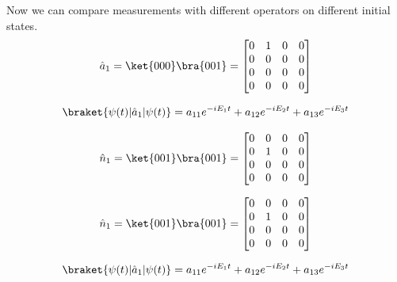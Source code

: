 {Now we can compare measurements with different operators on different initial states.
\begin{equation}
    \hat{a}_1 = \ket{000}\bra{001} =
    \begin{bmatrix}
        0 & 1 & 0 & 0 \\
        0 & 0 & 0 & 0 \\
        0 & 0 & 0 & 0 \\
        0 & 0 & 0 & 0 \\
    \end{bmatrix}
\end{equation}

\begin{equation}
    \braket{\psi(t)|\hat{a}_1|\psi(t)} = a_{11} e^{-i E_1 t} + a_{12} e^{-i E_2 t} + a_{13} e^{-i E_3 t}
\end{equation}

\begin{equation}
    \hat{n}_1 = \ket{001}\bra{001} =
    \begin{bmatrix}
        0 & 0 & 0 & 0 \\
        0 & 1 & 0 & 0 \\
        0 & 0 & 0 & 0 \\
        0 & 0 & 0 & 0 \\
    \end{bmatrix}
\end{equation}


\begin{equation}
    \hat{n}_1 = \ket{001}\bra{001} =
    \begin{bmatrix}
        0 & 0 & 0 & 0 \\
        0 & 1 & 0 & 0 \\
        0 & 0 & 0 & 0 \\
        0 & 0 & 0 & 0 \\
    \end{bmatrix}
\end{equation}

\begin{equation}
    \braket{\psi(t)|\hat{a}_1|\psi(t)} = a_{11} e^{-i E_1 t} + a_{12} e^{-i E_2 t} + a_{13} e^{-i E_3 t}
\end{equation}
} %

